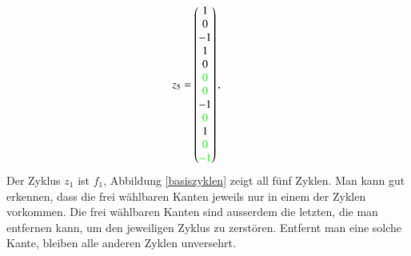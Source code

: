\[z_5=\begin{pmatrix}  1\\ 0\\-1\\ 1\\ 0\\\color{green} 0\\\color{green} 0\\-1\\\color{green} 0\\ 1\\\color{green} 0\\\color{green}-1\end{pmatrix},\qquad
\]
Der Zyklus $z_1$ ist $f_1$, Abbildung \ref{basiszyklen} zeigt all
fünf Zyklen. Man kann gut erkennen, dass die frei wählbaren Kanten
jeweils nur in einem der Zyklen vorkommen. Die frei wählbaren Kanten
sind ausserdem die letzten, die man entfernen kann, um den jeweiligen
Zyklus zu zerstören. Entfernt man eine solche Kante, bleiben alle
anderen Zyklen unversehrt.

